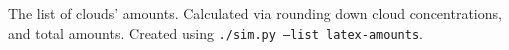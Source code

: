 \begin{table}

\caption{The list of clouds' amounts. Calculated via rounding down cloud concentrations, and total amounts. Created using \texttt{./sim.py --list latex-amounts}.}
\label{tbl:sim-list-amounts}
\end{table}
\restoregeometry
